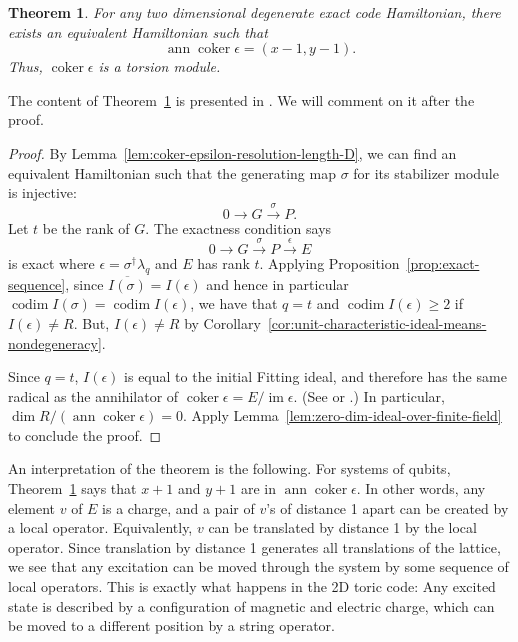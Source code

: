 \documentclass[letterpaper,12pt]{amsart}
\newtheorem{theorem}{Theorem}
\theoremstyle{definition} \newtheorem{defn}{Definition}
\theoremstyle{definition} \newtheorem{rem}{Remark}
\theoremstyle{definition} \newtheorem{example}{Example}
\newcommand{\im}{\mathop{\mathrm{im}}}
\newcommand{\coker}{\mathop{\mathrm{coker}}}
\newcommand{\ann}{\mathop{\mathrm{ann}}}
\newcommand{\codim}{\mathop{\mathrm{codim}}}
\begin{document}
\begin{theorem}
For any two dimensional degenerate exact code Hamiltonian,
there exists an equivalent Hamiltonian such that
\[
\ann \coker \epsilon = (x-1,y-1).
\]
Thus, $\coker \epsilon$ is a torsion module.
\label{thm:structure-2d-ann-coker-epsilon}
\end{theorem}
The content of Theorem~\ref{thm:structure-2d-ann-coker-epsilon}
is presented in \cite{Bombin2011Structure}.
We will comment on it after the proof.
\begin{proof}
By Lemma~\ref{lem:coker-epsilon-resolution-length-D},
we can find an equivalent Hamiltonian such that the generating map $\sigma$ for its stabilizer module
is injective:
\[
 0 \to G \xrightarrow{\sigma} P .
\]
Let $t$ be the rank of $G$.
The exactness condition says
\[
 0 \to G \xrightarrow{\sigma} P \xrightarrow{\epsilon} E
\]
is exact where $\epsilon = \sigma^\dagger \lambda_q$ and $E$ has rank $t$.
Applying Proposition~\ref{prop:exact-sequence},
since $\overline{ I(\sigma) } = I(\epsilon)$ 
and hence in particular $\codim I(\sigma) = \codim I(\epsilon)$,
we have that $q=t$ and $\codim I(\epsilon) \ge 2$ if $I(\epsilon) \ne R$.
But, $I(\epsilon) \ne R$ by Corollary~\ref{cor:unit-characteristic-ideal-means-nondegeneracy}.

Since $q=t$, $I(\epsilon)$ is equal to the initial Fitting ideal,
and therefore has the same radical as the annihilator of $\coker \epsilon = E/ \im \epsilon$.
(See \cite[Proposition~20.7]{Eisenbud} or \cite[Chapter~XIX Proposition~2.5]{Lang}.)
In particular, $\dim R / (\ann \coker \epsilon) = 0$.
Apply Lemma~\ref{lem:zero-dim-ideal-over-finite-field} to conclude the proof.
\end{proof}

An interpretation of the theorem is the following.
For systems of qubits, Theorem~\ref{thm:structure-2d-ann-coker-epsilon} says that
$x+1$ and $y+1$ are in $\ann \coker \epsilon$.
In other words, any element $v$ of $E$ is a charge,
and a pair of $v$'s of distance 1 apart
can be created by a local operator.
Equivalently, $v$ can be translated by distance 1 by the local operator.
Since translation by distance 1 generates all translations of the lattice,
we see that any excitation can be moved through the system by some sequence of local operators.
This is exactly what happens in the 2D toric code:
Any excited state is described by a configuration of magnetic and electric charge,
which can be moved to a different position by a string operator.
\end{document}
